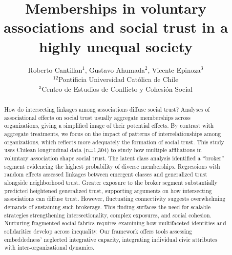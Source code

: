 



\usepackage{xcolor}


\title{Memberships in voluntary associations and social trust in a highly unequal society}
\author{Roberto Cantillan$^{1}$, Gustavo Ahumada$^{2}$, Vicente Epinoza$^{3}$ \\
        \small $^{12}$Pontificia Universidad Católica de Chile \\
         $^{3}$Centro de Estudios de Conflicto y Cohesión Social\\
}



\maketitle


\begin{abstract}
How do intersecting linkages among associations diffuse social trust? Analyses of associational effects on social trust usually aggregate memberships across organizations, giving a simplified image of their potential effects. By contrast with aggregate treatments, we focus on the impact of patterns of interrelationships among organizations, which reflects more adequately the formation of social trust. This study uses Chilean longitudinal data (n=1,304) to study how multiple affiliations in voluntary association shape social trust. The latent class analysis identified a “broker” segment evidencing the highest probability of diverse memberships. Regressions with random effects assessed linkages between emergent classes and generalized trust alongside neighborhood trust. Greater exposure to the broker segment substantially predicted heightened generalized trust, supporting arguments on how intersecting associations can diffuse trust. However, fluctuating connectivity suggests overwhelming demands of sustaining such brokerage. This finding surfaces the need for scalable strategies strengthening intersectionality, complex exposures, and social cohesion. Nurturing fragmented social fabrics requires examining how multifaceted identities and solidarities develop across inequality. Our framework offers tools assessing embeddedness’ neglected integrative capacity, integrating individual civic attributes with inter-organizational dynamics.
\end{abstract}
\hspace{10pt}


